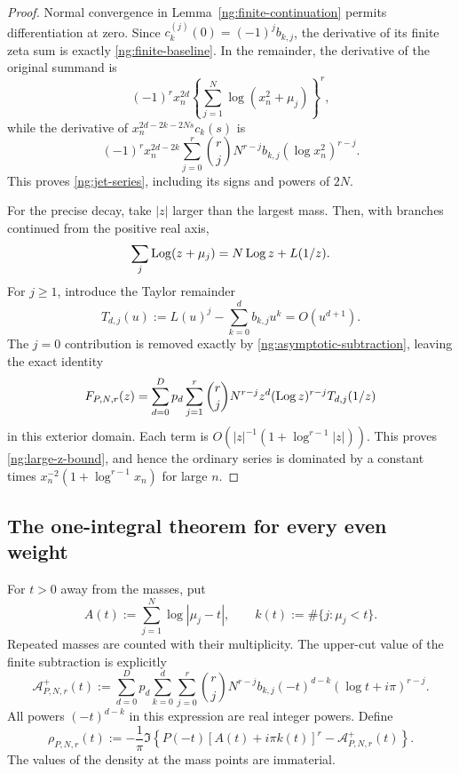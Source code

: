 \begin{proof}
Normal convergence in Lemma~\ref{ng:finite-continuation}
permits differentiation at zero.  Since
$c_k^{(j)}(0)=(-1)^j b_{k,j}$, the derivative of its finite
zeta sum is exactly \eqref{ng:finite-baseline}.
In the remainder, the derivative of the original summand is
\[
 (-1)^r x_n^{2d}
       \left\{\sum_{j=1}^{N}\log(x_n^2+\mu_j)\right\}^{r},
\]
while the derivative of
$x_n^{2d-2k-2Ns}c_k(s)$ is
\[
 (-1)^r x_n^{2d-2k}\sum_{j=0}^{r}
             \binom{r}{j}N^{r-j}b_{k,j}(\log x_n^2)^{r-j}.
\]
This proves \eqref{ng:jet-series}, including its signs and
powers of $2N$.

For the precise decay, take $|z|$ larger than the largest mass.
Then, with branches continued from the positive real axis,
\[
 \sum_j\operatorname{Log}(z+\mu_j)=N\operatorname{Log} z+L(1/z).
\]
For $j\geq1$, introduce the Taylor remainder
\[
 T_{d,j}(u):=L(u)^j-\sum_{k=0}^{d}b_{k,j}u^k
                    =O(u^{d+1}).
\]
The $j=0$ contribution is removed exactly by
\eqref{ng:asymptotic-subtraction}, leaving the exact identity
\begin{equation}
 F_{P,N,r}(z)
 =\sum_{d=0}^{D}p_d\sum_{j=1}^{r}
       \binom{r}{j}N^{r-j}z^d(\operatorname{Log} z)^{r-j}T_{d,j}(1/z)
 \label{ng:tail-decomposition}
\end{equation}
in this exterior domain.  Each term is
$O(|z|^{-1}(1+\log^{r-1}|z|))$.
This proves \eqref{ng:large-z-bound}, and hence the ordinary
series is dominated by a constant times
$x_n^{-2}(1+\log^{r-1}x_n)$ for large $n$.
\end{proof}


\subsection{The one-integral theorem for every even weight}
\label{ng:integral-subsection}

For $t>0$ away from the masses, put
\begin{equation}
 A(t):=\sum_{j=1}^{N}\log|\mu_j-t|,\qquad
 k(t):=\#\{j:\mu_j<t\}.
 \label{ng:cut-data}
\end{equation}
Repeated masses are counted with their multiplicity.
The upper-cut value of the finite subtraction is explicitly
\begin{equation}
 \mathcal A_{P,N,r}^{+}(t)
 :=\sum_{d=0}^{D}p_d\sum_{k=0}^{d}\sum_{j=0}^{r}
       \binom{r}{j}N^{r-j}b_{k,j}
                 (-t)^{d-k}(\log t+i\pi)^{r-j}.
 \label{ng:upper-subtraction}
\end{equation}
All powers $(-t)^{d-k}$ in this expression are real integer
powers.  Define
\begin{equation}
 \rho_{P,N,r}(t)
 :=-\frac1\pi\Im\left\{
       P(-t)[A(t)+i\pi k(t)]^r
                    -\mathcal A_{P,N,r}^{+}(t)\right\}.
 \label{ng:density}
\end{equation}
The values of the density at the mass points are immaterial.

